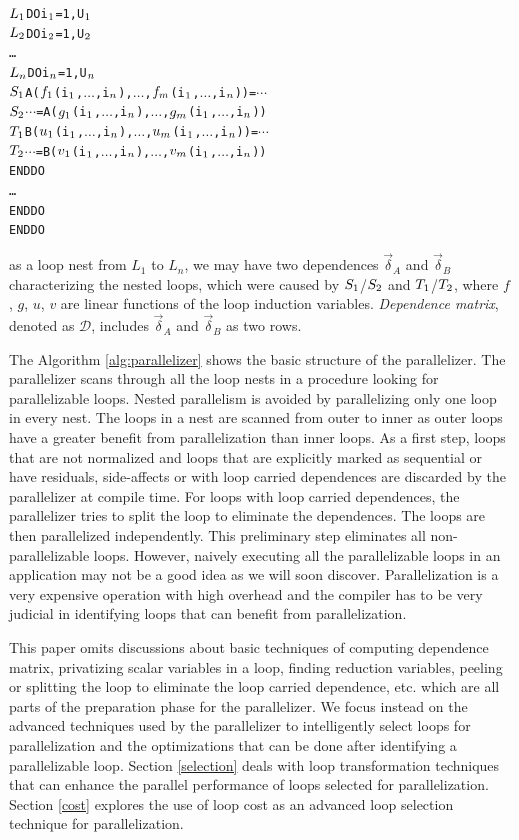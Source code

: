 {\small
\begin{alltt}
\(L\sb{1}\)   DO i\(\sb{1}\) = 1, U\(\sb{1}\)
\(L\sb{2}\)     DO i\(\sb{2}\) = 1, U\(\sb{2}\)
         \dots
\(L\sb{n}\)       DO i\(\sb{n}\) = 1, U\(\sb{n}\)
\(S\sb{1}\)         A(\(f\sb{1}\)(i\(\sb{1}\),\(\dots\),i\(\sb{n}\)),\(\dots\),\(f\sb{m}\)(i\(\sb{1}\),\(\dots\),i\(\sb{n}\)))=\(\cdots\)
\(S\sb{2}\)         \(\cdots\)=A(\(g\sb{1}\)(i\(\sb{1}\),\(\dots\),i\(\sb{n}\)),\(\dots\),\(g\sb{m}\)(i\(\sb{1}\),\(\dots\),i\(\sb{n}\)))
\(T\sb{1}\)         B(\(u\sb{1}\)(i\(\sb{1}\),\(\dots\),i\(\sb{n}\)),\(\dots\),\(u\sb{m}\)(i\(\sb{1}\),\(\dots\),i\(\sb{n}\)))=\(\cdots\)
\(T\sb{2}\)         \(\cdots\)=B(\(v\sb{1}\)(i\(\sb{1}\),\(\dots\),i\(\sb{n}\)),\(\dots\),\(v\sb{m}\)(i\(\sb{1}\),\(\dots\),i\(\sb{n}\)))
         END DO
         \dots
       END DO
     END DO
\end{alltt}
}

as a loop nest from $L_{1}$ to $L_{n}$, we may have two dependences
$\vec{\delta}_{A}$ and $\vec{\delta}_{B}$ characterizing the nested
loops, which were caused by $S\sb{1}$/$S\sb{2}$ and
$T\sb{1}$/$T\sb{2}$, where $f$, $g$, $u$, $v$ are linear functions of
the loop induction variables. \emph{Dependence matrix}, denoted as $\mathcal{D}$, includes
$\vec{\delta}_{A}$ and $\vec{\delta}_{B}$ as two rows.

The Algorithm \ref{alg:parallelizer} shows the basic structure of the
parallelizer. The parallelizer scans through all the loop nests in a procedure
looking for parallelizable loops.  Nested parallelism is avoided by
parallelizing only one loop in every nest.  The loops in a nest are
scanned from outer to inner as outer loops have a greater benefit from
parallelization than inner loops. As a first step, loops that are not normalized and loops that are explicitly marked as sequential or have residuals, side-affects or with loop carried dependences are discarded by the parallelizer at compile time. For loops with loop carried dependences, the parallelizer tries to split the loop to eliminate the dependences. The loops are then parallelized independently. This preliminary step eliminates all non-parallelizable loops. However, naively executing all the parallelizable loops in an application may not be a good idea as we will soon discover. Parallelization is a very expensive operation with high overhead and the compiler has to be very judicial in identifying loops that can benefit from parallelization. 

This paper omits discussions about basic techniques of computing dependence matrix, privatizing scalar variables in a
loop, finding reduction variables, peeling or splitting the loop to
eliminate the loop carried dependence, etc. which are all parts of the preparation
phase for the parallelizer. We focus instead on the advanced techniques used by the parallelizer to intelligently select loops for parallelization and the optimizations that can be done after identifying a parallelizable loop. Section \ref{selection} deals with loop transformation techniques that can enhance the parallel performance of loops selected for parallelization. Section \ref{cost} explores the use of loop cost as an advanced loop selection technique for parallelization. 

